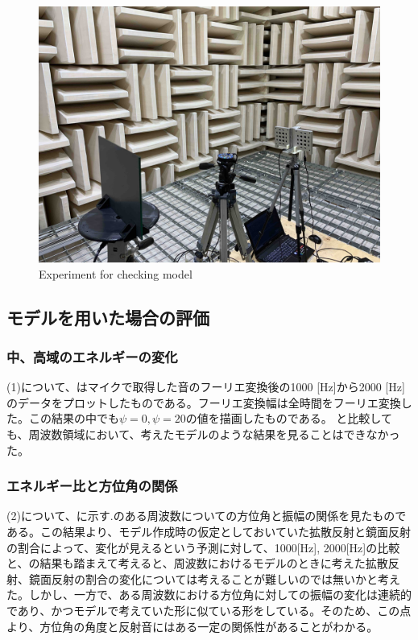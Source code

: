 \begin{figure}[ht]
  \begin{center}
  \vspace{1zh}
    \includegraphics[width=0.6\linewidth]{images/3_exp_anechoic.jpg}  
  \end{center}
  \caption{Experiment for checking model}
  \label{fig:exp_env}
\end{figure}

\subsection{モデルを用いた場合の評価}
\label{sec:result_model}
\subsubsection{中、高域のエネルギーの変化}
(1)について、はマイクで取得した音のフーリエ変換後の1000 [Hz]から2000 [Hz]のデータをプロットしたものである。フーリエ変換幅は全時間をフーリエ変換した。この結果の中でも$\psi=0, \psi=20$の値を描画したものである。
と比較しても、周波数領域において、考えたモデルのような結果を見ることはできなかった。



\subsubsection{エネルギー比と方位角の関係}
(2)について、に示す.のある周波数についての方位角と振幅の関係を見たものである。この結果より、モデル作成時の仮定としておいていた拡散反射と鏡面反射の割合によって、変化が見えるという予測に対して、1000[Hz], 2000[Hz]の比較と、の結果も踏まえて考えると、周波数におけるモデルのときに考えた拡散反射、鏡面反射の割合の変化については考えることが難しいのでは無いかと考えた。しかし、一方で、ある周波数における方位角に対しての振幅の変化は連続的であり、かつモデルで考えていた形に似ている形をしている。そのため、この点より、方位角の角度と反射音にはある一定の関係性があることがわかる。

